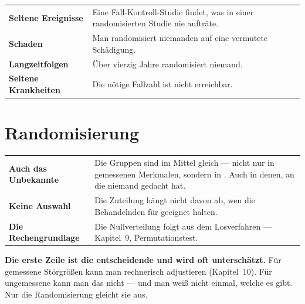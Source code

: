 \begin{warnung}
\begin{center}
\renewcommand{\arraystretch}{1.5}
\begin{tabular}{@{}P{2.8cm}P{5.8cm}@{}}
\toprule
\textbf{Seltene Ereignisse} & Eine Fall-Kontroll-Studie findet, was in einer randomisierten Studie nie aufträte.\\
\textbf{Schaden} & Man randomisiert niemanden auf eine vermutete Schädigung.\\
\textbf{Langzeitfolgen} & Über vierzig Jahre randomisiert niemand.\\
\textbf{Seltene Krankheiten} & Die nötige Fallzahl ist nicht erreichbar.\\
\bottomrule
\end{tabular}
\end{center}

\begin{center}
\begin{minipage}{0.88\textwidth}
\end{minipage}
\end{center}
\end{warnung}

\section{Randomisierung}

\begin{merksatz}
\begin{center}
{\small
\renewcommand{\arraystretch}{1.55}
\begin{tabular}{@{}P{2.6cm}P{6.0cm}@{}}
\toprule
\textbf{Auch das Unbekannte} & Die Gruppen sind im Mittel gleich --- nicht nur in gemessenen Merkmalen, sondern in . Auch in denen, an die niemand gedacht hat.\\
\textbf{Keine Auswahl} & Die Zuteilung hängt nicht davon ab, wen die Behandelnden für geeignet halten.\\
\textbf{Die Rechengrundlage} & Die Nullverteilung folgt aus dem Losverfahren --- Kapitel~9, Permutationstest.\\
\bottomrule
\end{tabular}}
\end{center}

\begin{center}
\begin{minipage}{0.9\textwidth}
\textbf{Die erste Zeile ist die entscheidende und wird oft unterschätzt.} Für gemessene Störgrößen kann man rechnerisch adjustieren (Kapitel~10). Für ungemessene kann man das nicht --- und man weiß nicht einmal, welche es gibt. Nur die Randomisierung gleicht sie aus.
\end{minipage}
\end{center}
\end{merksatz}

